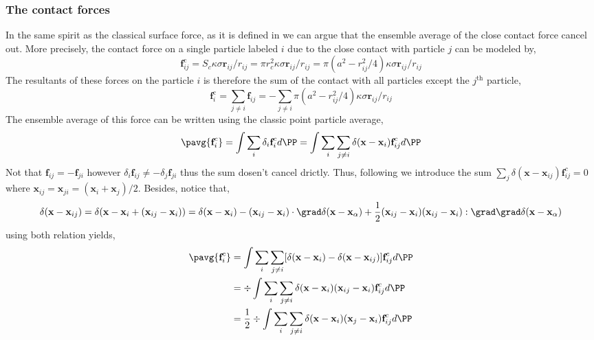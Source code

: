 \subsubsection*{The contact forces}
In the same spirit as the classical surface force, as it is defined in \citet{jackson1997locally,zhang1997momentum,nott2011suspension} we can argue that the ensemble average of the close contact force cancel out. 
More precisely, the contact force on a single particle labeled $i$ due to the close contact with particle $j$ can be modeled by, 
\begin{equation*}
    \textbf{f}_{ij}^\text{c}
    = S_c \kappa \sigma \textbf{r}_{ij}/r_{ij}
    = \pi r_c^2 \kappa \sigma \textbf{r}_{ij}/r_{ij}
    = \pi (a^2 - r_{ij}^2/4) \kappa \sigma  \textbf{r}_{ij}/r_{ij}
\end{equation*} 
The resultants of these forces on the particle $i$ is therefore the sum of the contact with all particles except the $j^\text{th}$ particle, 
\begin{equation*}
    \textbf{f}_{i}^\text{c}
    = \sum_{j \neq i}\textbf{f}_{ij}
    = - \sum_{j \neq i} \pi (a^2 - r_{ij}^2/4) \kappa \sigma \textbf{r}_{ij}/r_{ij}
\end{equation*} 
The ensemble average of this force can be written using the classic point particle average,
\begin{align}    
\pavg{\textbf{f}_i^c}
&=
\int \sum_{i} \delta_i 
\textbf{f}_i^c d\PP 
= \int \sum_{i} \sum_{j \neq i} \delta(\textbf{x} - \textbf{x}_i) 
\textbf{f}_{ij}^c d\PP 
\\
\end{align}
Not that $\textbf{f}_{ij} = - \textbf{f}_{ji}$ however $\delta_i \textbf{f}_{ij} \neq - \delta_j\textbf{f}_{ji}$ thus the sum dosen't cancel drictly. 
Thus, following \citet{nott2011suspension,zhang1997momentum} we introduce the sum $\sum_j \delta(\textbf{x}-\textbf{x}_{ij}) \textbf{f}_{ij}^c =0$ where $\textbf{x}_{ij} = \textbf{x}_{ji} = (\textbf{x}_i+\textbf{x}_j)/2$.
Besides, notice that, 
\begin{equation*}
    \delta(\textbf{x} - \textbf{x}_{ij})
    = 
    \delta(\textbf{x} - \textbf{x}_i + ( \textbf{x}_{ij} - \textbf{x}_i))
    =
    \delta(\textbf{x} - \textbf{x}_i )
    - ( \textbf{x}_{ij} - \textbf{x}_i)\cdot \grad \delta(\textbf{x}-\textbf{x}_\alpha)
    +\frac{1}{2} (\textbf{x}_{ij} - \textbf{x}_i)(\textbf{x}_{ij} - \textbf{x}_i) : \grad\grad \delta(\textbf{x}-\textbf{x}_\alpha)
\end{equation*}
using both relation yields, 
\begin{align}    
    \pavg{\textbf{f}_i^c}
    &= \int \sum_{i} \sum_{j \neq i} [
        \delta(\textbf{x} - \textbf{x}_i)
        -\delta(\textbf{x} - \textbf{x}_{ij})]
    \textbf{f}_{ij}^c d\PP 
    \\
    &= \div \int \sum_{i} \sum_{j \neq i} \delta(\textbf{x}-\textbf{x}_i) (\textbf{x}_{ij} - \textbf{x}_i)
    \textbf{f}_{ij}^c d\PP 
    \\
    &= \frac{1}{2}\div \int \sum_{i} \sum_{j \neq i} \delta(\textbf{x}-\textbf{x}_i) (\textbf{x}_{j} - \textbf{x}_i)
    \textbf{f}_{ij}^c d\PP 
\end{align}
